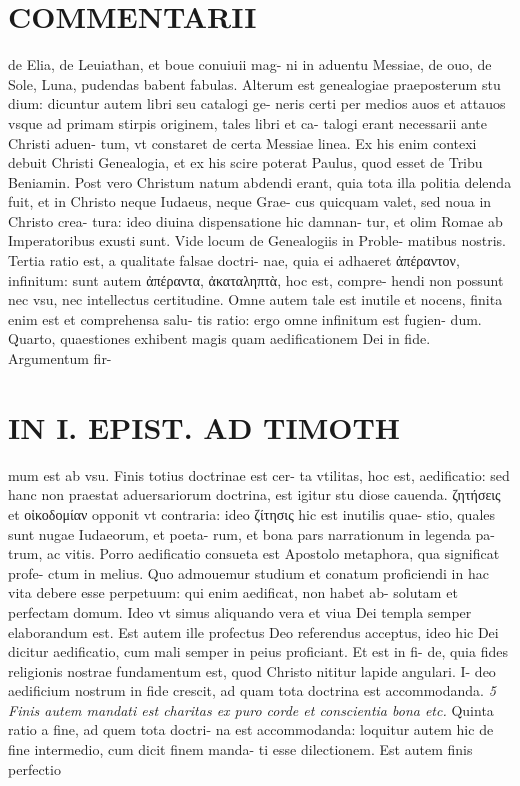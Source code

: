 \documentclass{article}
\begin{document}
\begin{pages}
\section*{COMMENTARII }\pstart de Elia, de Leuiathan, et boue conuiuii mag- ni in aduentu Messiae, de ouo, de Sole, Luna, pudendas babent fabulas.  \pend\pstart Alterum est genealogiae praeposterum stu dium: dicuntur autem libri seu catalogi ge- neris certi per medios auos et attauos vsque ad primam stirpis originem, tales libri et ca- talogi erant necessarii ante Christi aduen- tum, vt constaret de certa Messiae linea. Ex his enim contexi debuit Christi Genealogia, et ex his scire poterat Paulus, quod esset de Tribu Beniamin. Post vero Christum natum abdendi erant, quia tota illa politia delenda fuit, et in Christo neque Iudaeus, neque Grae- cus quicquam valet, sed noua in Christo crea- tura: ideo diuina dispensatione hic damnan- tur, et olim Romae ab Imperatoribus exusti sunt. Vide locum de Genealogiis in Proble- matibus nostris.  \pend\pstart Tertia ratio est, a qualitate falsae doctri- nae, quia ei adhaeret ἀπέραντον, infinitum: sunt autem ἀπέραντα, ἀκαταληπτὰ, hoc est, compre- hendi non possunt nec vsu, nec intellectus certitudine. Omne autem tale est inutile et nocens, finita enim est et comprehensa salu- tis ratio: ergo omne infinitum est fugien- dum.  \pend\pstart Quarto, quaestiones exhibent magis quam aedificationem Dei in fide. Argumentum fir-  \pend
\section*{IN I. EPIST. AD TIMOTH }
\marginpar{[ p.21 ]}\pstart mum est ab vsu. Finis totius doctrinae est cer- ta vtilitas, hoc est, aedificatio: sed hanc non praestat aduersariorum doctrina, est igitur stu diose cauenda. ζητήσεις et οἰκοδομίαν opponit vt contraria: ideo ζίτησις hic est inutilis quae- stio, quales sunt nugae Iudaeorum, et poeta- rum, et bona pars narrationum in legenda pa- trum, ac vitis. Porro aedificatio consueta est Apostolo metaphora, qua significat profe- ctum in melius. Quo admouemur studium et conatum proficiendi in hac vita debere esse perpetuum: qui enim aedificat, non habet ab- solutam et perfectam domum. Ideo vt simus aliquando vera et viua Dei templa semper elaborandum est.  \pend\pstart Est autem ille profectus Deo referendus acceptus, ideo hic Dei dicitur aedificatio, cum mali semper in peius proficiant. Et est in fi- de, quia fides religionis nostrae fundamentum est, quod Christo nititur lapide angulari. I- deo aedificium nostrum in fide crescit, ad quam tota doctrina est accommodanda.  \pend
\textit{5 Finis autem mandati est charitas ex puro corde et conscientia bona etc. }\pstart Quinta ratio a fine, ad quem tota doctri- na est accommodanda: loquitur autem hic de fine intermedio, cum dicit finem manda- ti esse dilectionem. Est autem finis perfectio  \pend
\marginpar{[ p.22 ]}

\end{pages}
\end{document}
